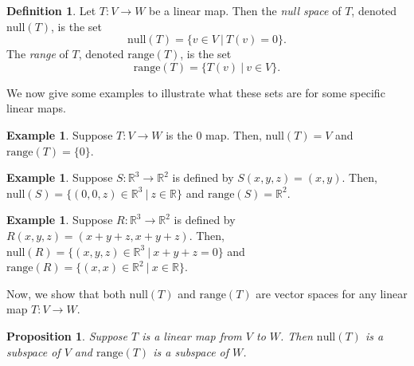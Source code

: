 \documentclass[11pt,reqno]{amsart}
\newtheorem{proposition}[theorem]{Proposition}
\theoremstyle{definition}
\newtheorem{definition}[theorem]{Definition}
\newtheorem{example}[theorem]{Example}
\newcommand{\R}{\mathbb{R}}
\newcommand{\nul}{\mathrm{null}}
\newcommand{\range}{\mathrm{range}}
\begin{document}
\begin{definition}
Let $T: V \rightarrow W$ be a linear map. Then the \emph{null space} of $T$, denoted $\nul(T)$, is the set
$$
\nul(T) = \{v \in V\ |\ T(v) = 0\}.
$$
The \emph{range} of $T$, denoted $\range(T)$, is the set
$$
\range(T) = \{T(v)\ |\ v \in V\}.
$$
\end{definition}

We now give some examples to illustrate what these sets are for some specific linear maps.

\begin{example}
\label{ex:1}
Suppose $T: V \rightarrow W$ is the 0 map. Then, $\nul(T) = V$ and $\range(T) = \{0\}$.
\end{example}

\begin{example}
\label{ex:2}
Suppose $S:\R^3 \rightarrow \R^2$ is defined by $S(x,y,z) = (x,y)$. Then, $\nul(S) = \{(0,0,z) \in \R^3\ |\ z\in \R\}$ and $\range(S) = \R^2$.
\end{example}


\begin{example}
\label{ex:3}
Suppose $R:\R^3 \rightarrow \R^2$ is defined by $R(x,y,z) = (x+y+z, x+y+z)$. Then, $\nul(R) = \{(x,y,z) \in \R^3\ |\ x+y+z=0\}$ and $\range(R) = \{(x,x)\in \R^2\ |\ x \in \R\}$.
\end{example}


Now, we show that both $\nul(T)$ and $\range(T)$ are vector spaces for any linear map $T:V \rightarrow W$.

\begin{proposition}
Suppose $T$ is a linear map from $V$ to $W$. Then $\nul(T)$ is a subspace of $V$ and $\range(T)$ is a subspace of $W$.
\end{proposition}
\end{document}
